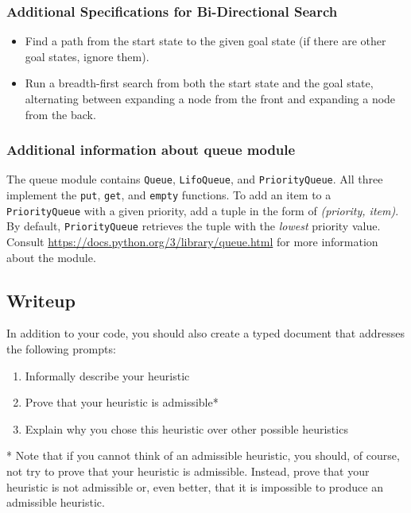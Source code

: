 \documentclass{article}
\begin{document}
\subsubsection{Additional Specifications for Bi-Directional Search}
\begin{itemize}
    \item  Find a path from the start state to the given goal state (if there are other goal states, ignore them).
    \item  Run a breadth-first search from both the start state and the goal state, alternating between expanding a node from the front and expanding a node from the back.
\end{itemize}

\subsubsection{Additional information about queue module}
\label{sec:queue}
The queue module contains \texttt{Queue}, \texttt{LifoQueue}, and \texttt{PriorityQueue}. All three implement the \texttt{put}, \texttt{get}, and \texttt{empty} functions.
To add an item to a \texttt{PriorityQueue} with a given priority, add a tuple in the form of \textit{(priority, item)}.
By default, \texttt{PriorityQueue} retrieves the tuple with the \textit{lowest} priority value.
Consult \url{https://docs.python.org/3/library/queue.html} for more information about the module.

\subsection{Writeup}
In addition to your code, you should also create a typed document that addresses the following prompts:

\begin{enumerate}
  \item Informally describe your heuristic
  \item Prove that your heuristic is admissible*
  \item Explain why you chose this heuristic over other possible heuristics
\end{enumerate}

* Note that if you cannot think of an admissible heuristic, you should, of course, not try to prove that your heuristic is admissible.
Instead, prove that your heuristic is not admissible or, even better, that it is impossible to produce an admissible heuristic. \\
\end{document}
